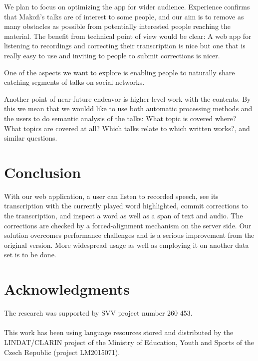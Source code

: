 \documentclass{svproc}
\begin{document}
We plan to focus on optimizing the app for wider audience. Experience confirms
that Mako\v{n}'s talks are of interest to some people, and our aim is to
remove as many obstacles as possible from potentially interested people reaching
the material. The benefit from technical point of view would be clear: A web app
for listening to recordings and correcting their transcription is nice but one
that is really easy to use and inviting to people to submit corrections is nicer.

One of the aspects we want to explore is enabling people to naturally share
catching segments of talks on social networks.

Another point of near-future endeavor is higher-level work with the contents. By
this we mean that we wouldd like to use both automatic processing methods and the
users to do semantic analysis of the talks: What topic is covered where? What
topics are covered at all? Which talks relate to which written works?, and
similar questions.

\section{Conclusion}

With our web application, a user can listen to recorded speech, see its
transcription with the currently played word highlighted, commit corrections to
the transcription, and inspect a word as well as a span of text and audio. The
corrections are checked by a forced-alignment mechanism on the server side. Our
solution overcomes performance challenges and is a serious improvement from the
original version. More widespread usage as well as employing it on another data
set is to be done.

\section*{Acknowledgments}

The research was supported by SVV project number 260 453.\\
\\
This work has been using language resources stored
and distributed  by the LINDAT/CLARIN project of the Ministry of Education,
Youth and Sports of the Czech Republic (project LM2015071).



\end{document}
